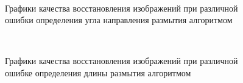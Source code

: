 \begin{figure}[H]
\begin{minipage}[8]{1\linewidth}
 \\ 
\end{minipage}
\caption{ Графики качества восстановления изображений при различной ошибки определения угла направления размытия алгоритмом }
\label{ris:plots_a}
\end{figure}

\begin{figure}[H]
\begin{minipage}[t]{1\linewidth}
  \\ 
\end{minipage}
\caption{ Графики качества восстановления изображений при различной ошибке определения длины размытия алгоритмом }
\label{ris:plots_l}
\end{figure}



